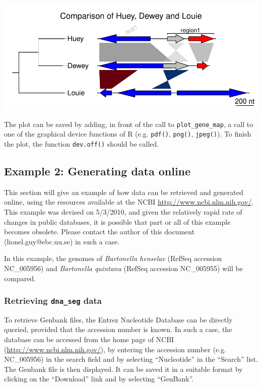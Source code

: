 \documentclass[a4paper]{article}
\newcommand{\code}[1]{\texttt{#1}}
\newcommand{\R}{{\sffamily R}}
\begin{document}
\begin{center}
\includegraphics{genoPlotR-021}
\end{center}
The plot can be saved by adding, in front of the call to 
\code{plot\_gene\_map}, a call to one of the graphical device functions of 
\R{} (e.g. \code{pdf()}, \code{png()}, \code{jpeg()}). To finish the plot,
the function \code{dev.off()} should be called.

\subsection{Example 2: Generating data online}

This section will give an example of how data can be retrieved and generated
online, using the resources available at the NCBI
\url{http://www.ncbi.nlm.nih.gov/}. This example was devised on 5/3/2010, and
given the relatively rapid rate of changes in public databases, it is 
possible that part or all of this example becomes obsolete. Please contact
the author of this document (lionel.guy@ebc.uu.se) in such a case.

In this example, the genomes of \emph{Bartonella henselae} 
(RefSeq accession NC\_005956) and \emph{Bartonella quintana} (RefSeq 
accession NC\_005955) will be compared.

\subsubsection{Retrieving \code{dna\_seg} data}

To retrieve Genbank files, the Entrez Nucleotide Database can be directly 
queried, provided that the accession number is known. In such a case, the
database can be accessed from the home page of NCBI 
(\url{http://www.ncbi.nlm.nih.gov/}), by entering the accession number 
(e.g. NC\_005956) in the search field and by selecting ``Nucleotide'' in 
the ``Search'' list. The Genbank file is then displayed. It can be saved it in 
a suitable format by clicking on the ``Download'' link and by selecting 
``GenBank''. 
\end{document}
